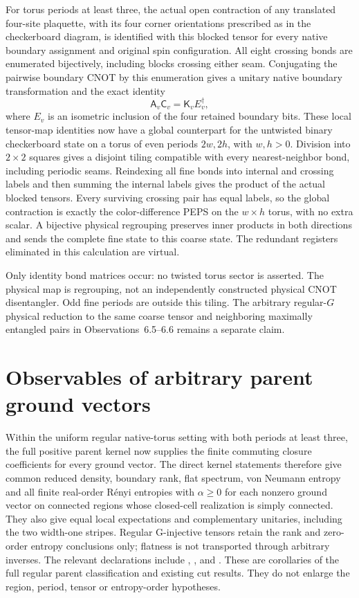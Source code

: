 \documentclass{article}
\begin{document}
For torus periods at least three, the actual open contraction of any
translated four-site plaquette, with its four corner orientations prescribed
as in the checkerboard diagram, is identified with this blocked tensor for
every native boundary assignment and original spin configuration. All eight
crossing bonds are enumerated bijectively, including blocks crossing either
seam. Conjugating the pairwise boundary CNOT by this enumeration gives a
unitary native boundary transformation and the exact identity
\[
    \mathsf A_v\mathsf C_v=\mathsf K_v E_v^\dagger,
\]
where $E_v$ is an isometric inclusion of the four retained boundary bits.
These local tensor-map identities now have a global counterpart for the
untwisted binary checkerboard state on a torus of even periods $2w,2h$,
with $w,h>0$. Division into $2\times2$ squares gives a disjoint tiling
compatible with every nearest-neighbor bond, including periodic seams.
Reindexing all fine bonds into internal and crossing labels and then
summing the internal labels gives the product of the actual blocked tensors.
Every surviving crossing pair has equal labels, so the global contraction
is exactly the color-difference PEPS on the $w\times h$ torus, with no
extra scalar. A bijective physical regrouping preserves inner products in
both directions and sends the complete fine state to this coarse state.
The redundant registers eliminated in this calculation are virtual.

Only identity bond matrices occur: no twisted torus sector is asserted.
The physical map is regrouping, not an independently constructed physical
CNOT disentangler. Odd fine periods are outside this tiling. The arbitrary
regular-$G$ physical reduction to the same coarse tensor and neighboring
maximally entangled pairs in Observations~6.5--6.6 remains a separate claim.

\section{Observables of arbitrary parent ground vectors}
Within the uniform regular native-torus setting with both periods at least
three, the full positive parent kernel now supplies the finite commuting
closure coefficients for every ground vector. The direct kernel statements
therefore give common reduced density, boundary rank, flat spectrum,
von Neumann entropy and all finite real-order R\'enyi entropies with
$\alpha\geq0$ for each nonzero ground vector on connected regions whose
closed-cell realization is simply connected. They also give equal local
expectations and complementary unitaries, including the two width-one
stripes. Regular G-injective tensors retain the rank and zero-order entropy
conclusions only; flatness is not transported through arbitrary inverses.
The relevant declarations include
,
,
and
.
These are corollaries of the full regular parent classification and existing
cut results. They do not enlarge the region, period, tensor or entropy-order
hypotheses.
\end{document}
